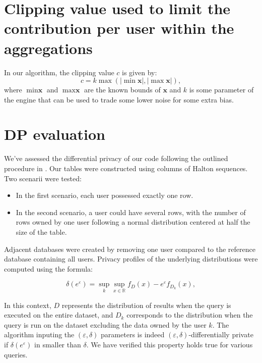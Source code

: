 \documentclass[letterpaper]{article} %
\begin{document}
\section*{Clipping value used to limit the contribution per user within the aggregations}
\label{sec:limit_contrib_per_user}

In our algorithm, the clipping value $c$ is given by:
\begin{equation}
    c = k \max ( |\min \textbf{x}|, |\max \textbf{x}|),
\end{equation}
where $\min \textbf{x}$ and $\max \textbf{x}$ are the known bounds of $\textbf{x}$ and $k$ is some parameter of the engine that can be used to trade some lower noise for some extra bias.

\section*{DP evaluation}
We've assessed the differential privacy of our code following the outlined procedure in \citeauthor{wilson2019differentially}. Our tables were constructed using columns of Halton sequences.
Two scenarii were tested:

\begin{itemize}
    \item In the first scenario, each user possessed exactly one row.
    \item In the second scenario, a user could have several rows, with the number of rows owned by one user following a normal distribution centered at half the size of the table.
\end{itemize}

Adjacent databases were created by removing one user compared to the reference database containing all users. Privacy profiles of the underlying distributions were computed using the formula:

\begin{equation}
    \delta(e^{\varepsilon}) = \sup_{k} \sup_{x\in\mathbb{R}} f_{D}(x) - e^{\varepsilon}f_{D_k}(x),
\end{equation}

In this context, $D$ represents the distribution of results when the query is executed on the entire dataset,
and $D_k$ corresponds to the distribution when the query is run on the dataset excluding the data owned by the user $k$.
The algorithm inputing the $(\varepsilon, \delta)$ parameters is indeed $(\varepsilon, \delta)$-differentially private if $\delta(e^{\varepsilon})$ in smaller than $\delta$.
We have verified this property holds true for various queries.
\end{document}
